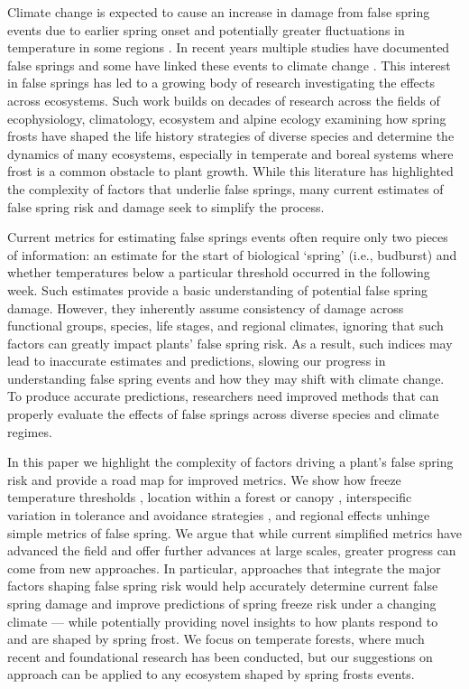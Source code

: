 \documentclass{article}\usepackage[]{graphicx}\usepackage[]{color}
\begin{document}
Climate change is expected to cause an increase in damage from false spring events due to earlier spring onset and potentially greater fluctuations in temperature in some regions \citep{Inouye2008, Martin2010}. In recent years multiple studies have documented false springs \citep{Augspurger2009, Augspurger2013, Gu2008, Menzel2015} and some have linked these events to climate change \citep{Allstadt2015, Ault2013,  Muffler2016, Vitra2017, Xin2016}. This interest in false springs has led to a growing body of research investigating the effects across ecosystems. Such work builds on decades of research across the fields of ecophysiology, climatology, ecosystem and alpine ecology examining how spring frosts have shaped the life history strategies of diverse species and determine the dynamics of many ecosystems, especially in temperate and boreal systems where frost is a common obstacle to plant growth. While this literature has highlighted the complexity of factors that underlie false springs, many current estimates of false spring risk and damage seek to simplify the process. 

Current metrics for estimating false springs events often require only two pieces of information: an estimate for the start of biological `spring' (i.e., budburst) and whether temperatures below a particular threshold occurred in the following week. Such estimates provide a basic understanding of potential false spring damage. However, they inherently assume consistency of damage across functional groups, species, life stages, and regional climates, ignoring that such factors can greatly impact plants' false spring risk. As a result, such indices may lead to inaccurate estimates and predictions, slowing our progress in understanding false spring events and how they may shift with climate change. To produce accurate predictions, researchers need improved methods that can properly evaluate the effects of false springs across diverse species and climate regimes.

In this paper we highlight the complexity of factors driving a plant's false spring risk and provide a road map for improved metrics. We show how freeze temperature thresholds \citep{Lenz2013}, location within a forest or canopy \citep{Augspurger2013}, interspecific variation in tolerance and avoidance strategies \citep{Martin2010, Muffler2016}, and regional effects \citep{Muffler2016} unhinge simple metrics of false spring. We argue that while current simplified metrics have advanced the field and offer further advances at large scales, greater progress can come from new approaches. In particular, approaches that integrate the major factors shaping false spring risk would help accurately determine current false spring damage and improve predictions of spring freeze risk under a changing climate --- while potentially providing novel insights to how plants respond to and are shaped by spring frost. We focus on temperate forests, where much recent and foundational research has been conducted, but our suggestions on approach can be applied to any ecosystem shaped by spring frosts events.   
\end{document}
